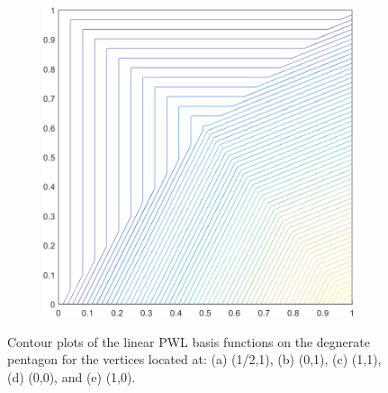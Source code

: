 \begin{figure}
\begin{subfigure}[b]{0.39\textwidth}
		\caption{}
	\end{subfigure}
	\hspace{1.5cm}
	\begin{subfigure}[b]{0.39\textwidth}
		\centering
		\includegraphics[width=\textwidth]{figures/sec_BF/deg_square_PWLD1_contour_b2.png}
		\caption{}
	\end{subfigure}
\caption{Contour plots of the linear PWL basis functions on the degnerate pentagon for the vertices located at: (a) (1/2,1), (b) (0,1), (c) (1,1), (d) (0,0), and (e) (1,0).}
\end{figure}

